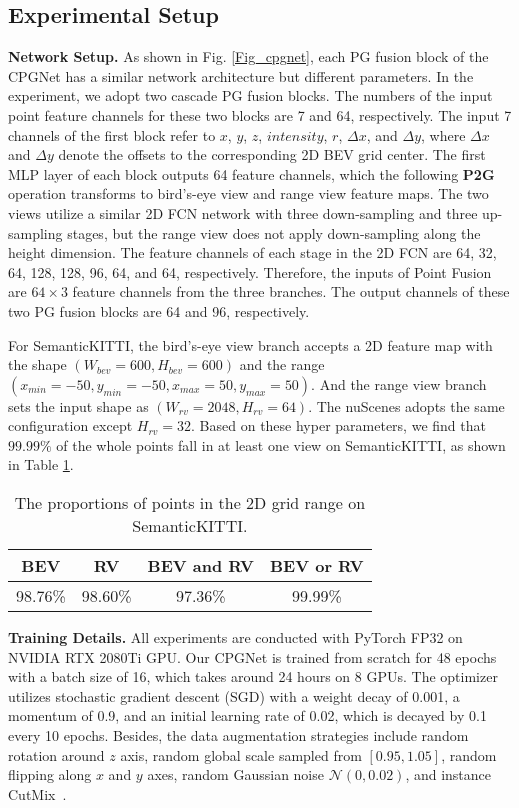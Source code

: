\documentclass[letterpaper, 10 pt, conference]{ieeeconf}
\begin{document}
\subsection{Experimental Setup}
{\bf Network Setup.}
As shown in Fig. \ref{Fig_cpgnet}, each PG fusion block of the CPGNet has a similar network architecture but different parameters. In the experiment, we adopt two cascade PG fusion blocks. The numbers of the input point feature channels for these two blocks are 7 and 64, respectively. The input 7 channels of the first block refer to $x$, $y$, $z$, $intensity$, $r$, $\Delta x$, and $\Delta y$, where $\Delta x$ and $\Delta y$ denote the offsets to the corresponding 2D BEV grid center. The first MLP layer of each block outputs 64 feature channels, which the following {\bf P2G} operation transforms to bird’s-eye view and range view feature maps. The two views utilize a similar 2D FCN network with three down-sampling and three up-sampling stages, but the range view does not apply down-sampling along the height dimension. The feature channels of each stage in the 2D FCN are 64, 32, 64, 128, 128, 96, 64, and 64, respectively. Therefore, the inputs of Point Fusion are $64 \times 3$ feature channels from the three branches. The output channels of these two PG fusion blocks are 64 and 96, respectively.

For SemanticKITTI, the bird’s-eye view branch accepts a 2D feature map with the shape $(W_{bev}=600, H_{bev}=600)$ and the range $(x_{min}=-50, y_{min}=-50, x_{max}=50, y_{max}=50)$. And the range view branch sets the input shape as $(W_{rv}=2048, H_{rv}=64)$. The nuScenes adopts the same configuration except $H_{rv}=32$. Based on these hyper parameters, we find that $99.99\%$ of the whole points fall in at least one view on SemanticKITTI, as shown in Table \ref{table_in_range}.

\begin{table}[t]
\caption{The proportions of points in the 2D grid range on SemanticKITTI.}
\label{table_in_range}
\begin{center}
\begin{tabular}{c|c|c|c}
\hline
BEV & RV & BEV and RV & BEV or RV\\
\hline
98.76\% & 98.60\% & 97.36\% & 99.99\%\\
\hline
\end{tabular}
\end{center}
\end{table}

{\bf Training Details.}
All experiments are conducted with PyTorch FP32 on NVIDIA RTX 2080Ti GPU. Our CPGNet is trained from scratch for 48 epochs with a batch size of 16, which takes around 24 hours on 8 GPUs. The optimizer utilizes stochastic gradient descent (SGD) with a weight decay of 0.001, a momentum of 0.9, and an initial learning rate of 0.02, which is decayed by 0.1 every 10 epochs. Besides, the data augmentation strategies include random rotation around $z$ axis, random global scale sampled from $[0.95, 1.05]$, random flipping along $x$ and $y$ axes, random Gaussian noise $\mathcal{N}(0, 0.02)$, and instance CutMix~\cite{xu2021rpvnet}.
\end{document}
